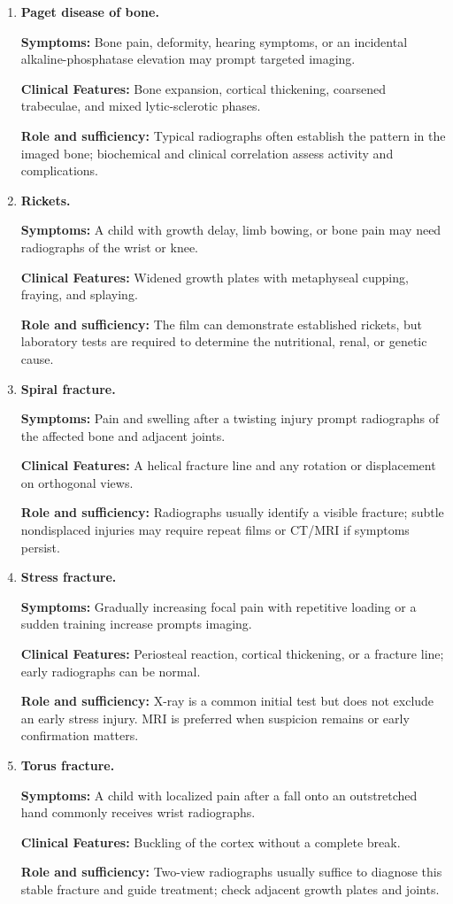 \begin{enumerate}[leftmargin=*,itemsep=0.45em,topsep=0.4em]
\item \textbf{Paget disease of bone.}\par\noindent\textbf{Symptoms:} Bone pain, deformity, hearing symptoms, or an incidental alkaline-phosphatase elevation may prompt targeted imaging.\par\noindent\textbf{Clinical Features:} Bone expansion, cortical thickening, coarsened trabeculae, and mixed lytic-sclerotic phases.\par\noindent\textbf{Role and sufficiency:} Typical radiographs often establish the pattern in the imaged bone; biochemical and clinical correlation assess activity and complications.
\item \textbf{Rickets.}\par\noindent\textbf{Symptoms:} A child with growth delay, limb bowing, or bone pain may need radiographs of the wrist or knee.\par\noindent\textbf{Clinical Features:} Widened growth plates with metaphyseal cupping, fraying, and splaying.\par\noindent\textbf{Role and sufficiency:} The film can demonstrate established rickets, but laboratory tests are required to determine the nutritional, renal, or genetic cause.
\item \textbf{Spiral fracture.}\par\noindent\textbf{Symptoms:} Pain and swelling after a twisting injury prompt radiographs of the affected bone and adjacent joints.\par\noindent\textbf{Clinical Features:} A helical fracture line and any rotation or displacement on orthogonal views.\par\noindent\textbf{Role and sufficiency:} Radiographs usually identify a visible fracture; subtle nondisplaced injuries may require repeat films or CT/MRI if symptoms persist.
\item \textbf{Stress fracture.}\par\noindent\textbf{Symptoms:} Gradually increasing focal pain with repetitive loading or a sudden training increase prompts imaging.\par\noindent\textbf{Clinical Features:} Periosteal reaction, cortical thickening, or a fracture line; early radiographs can be normal.\par\noindent\textbf{Role and sufficiency:} X-ray is a common initial test but does not exclude an early stress injury. MRI is preferred when suspicion remains or early confirmation matters.
\item \textbf{Torus fracture.}\par\noindent\textbf{Symptoms:} A child with localized pain after a fall onto an outstretched hand commonly receives wrist radiographs.\par\noindent\textbf{Clinical Features:} Buckling of the cortex without a complete break.\par\noindent\textbf{Role and sufficiency:} Two-view radiographs usually suffice to diagnose this stable fracture and guide treatment; check adjacent growth plates and joints.

\end{enumerate}
